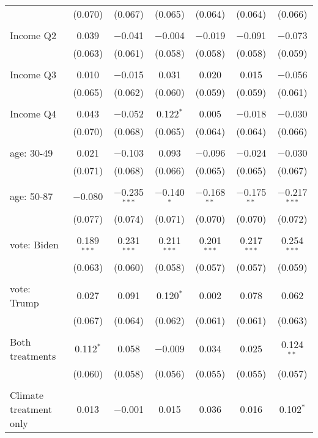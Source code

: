 \begin{tabular}{@{\extracolsep{5pt}}lcccccc}
  & (0.070) & (0.067) & (0.065) & (0.064) & (0.064) & (0.066) \\ 
  & & & & & & \\ 
 Income Q2 & 0.039 & $-$0.041 & $-$0.004 & $-$0.019 & $-$0.091 & $-$0.073 \\ 
  & (0.063) & (0.061) & (0.058) & (0.058) & (0.058) & (0.059) \\ 
  & & & & & & \\ 
 Income Q3 & 0.010 & $-$0.015 & 0.031 & 0.020 & 0.015 & $-$0.056 \\ 
  & (0.065) & (0.062) & (0.060) & (0.059) & (0.059) & (0.061) \\ 
  & & & & & & \\ 
 Income Q4 & 0.043 & $-$0.052 & 0.122$^{*}$ & 0.005 & $-$0.018 & $-$0.030 \\ 
  & (0.070) & (0.068) & (0.065) & (0.064) & (0.064) & (0.066) \\ 
  & & & & & & \\ 
 age: 30-49 & 0.021 & $-$0.103 & 0.093 & $-$0.096 & $-$0.024 & $-$0.030 \\ 
  & (0.071) & (0.068) & (0.066) & (0.065) & (0.065) & (0.067) \\ 
  & & & & & & \\ 
 age: 50-87 & $-$0.080 & $-$0.235$^{***}$ & $-$0.140$^{*}$ & $-$0.168$^{**}$ & $-$0.175$^{**}$ & $-$0.217$^{***}$ \\ 
  & (0.077) & (0.074) & (0.071) & (0.070) & (0.070) & (0.072) \\ 
  & & & & & & \\ 
 vote: Biden & 0.189$^{***}$ & 0.231$^{***}$ & 0.211$^{***}$ & 0.201$^{***}$ & 0.217$^{***}$ & 0.254$^{***}$ \\ 
  & (0.063) & (0.060) & (0.058) & (0.057) & (0.057) & (0.059) \\ 
  & & & & & & \\ 
 vote: Trump & 0.027 & 0.091 & 0.120$^{*}$ & 0.002 & 0.078 & 0.062 \\ 
  & (0.067) & (0.064) & (0.062) & (0.061) & (0.061) & (0.063) \\ 
  & & & & & & \\ 
 Both treatments & 0.112$^{*}$ & 0.058 & $-$0.009 & 0.034 & 0.025 & 0.124$^{**}$ \\ 
  & (0.060) & (0.058) & (0.056) & (0.055) & (0.055) & (0.057) \\ 
  & & & & & & \\ 
 Climate treatment only & 0.013 & $-$0.001 & 0.015 & 0.036 & 0.016 & 0.102$^{*}$ \\ 

\end{tabular}
